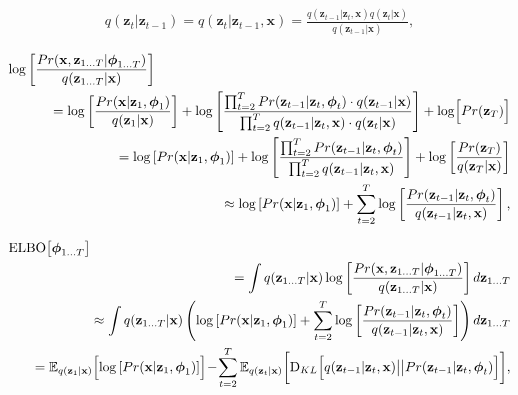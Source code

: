 \documentclass[letterpaper,twoside,openany, titlepage,oldfontcommands,titles,dvipsnames]{memoir}
\begin{document}
\begin{eqnarray}
 q(\mathbf{z}_{t}|\mathbf{z}_{t-1}) = q(\mathbf{z}_{t}|\mathbf{z}_{t-1},\mathbf{x}) = \frac{q(\mathbf{z}_{t-1}|\mathbf{z}_{t},\mathbf{x})q(\mathbf{z}_{t}|\mathbf{x})}{q(\mathbf{z}_{t-1}|\mathbf{x})},
 \end{eqnarray}

\begin{eqnarray}\label{eq:diffusion_simplify_2}
 \log\left[
 \frac{Pr(\mathbf{x},\mathbf{z}_{1\ldots T}|\boldsymbol\phi_{1\ldots T}) }{q(\mathbf{z}_{1\ldots T}|\mathbf{x})}\right] &&\nonumber \\
 &&\hspace{-3cm}= \log\left[\frac{ Pr(\mathbf{x}|\mathbf{z}_{1},\boldsymbol\phi_1)}{q(\mathbf{z}_{1}|\mathbf{x})}\right]+\log\left[\frac{\prod_{t=2}^{T}Pr(\mathbf{z}_{t-1}|\mathbf{z}_{t},\boldsymbol\phi_t)\cdot q(\mathbf{z}_{t-1}|\mathbf{x})}{\prod_{t=2}^{T}q(\mathbf{z}_{t-1}|\mathbf{z}_{t},\mathbf{x})\cdot q(\mathbf{z}_{t}|\mathbf{x})}\right]+\log\Bigl[Pr(\mathbf{z}_{T})\Bigr]\nonumber \\
 &&\hspace{-3cm}=\log\left[Pr(\mathbf{x}|\mathbf{z}_{1},\boldsymbol\phi_1)\right]+\log\left[\frac{\prod_{t=2}^{T}Pr(\mathbf{z}_{t-1}|\mathbf{z}_{t},\boldsymbol\phi_t)}{\prod_{t=2}^{T}q(\mathbf{z}_{t-1}|\mathbf{z}_{t},\mathbf{x})}\right]+\log\left[\frac{Pr(\mathbf{z}_{T})}{q(\mathbf{z}_{T}|\mathbf{x})} \right]\nonumber\\
 &&\hspace{-3cm}\approx\log\left[Pr(\mathbf{x}|\mathbf{z}_{1},\boldsymbol\phi_1)\right]+\sum_{t=2}^{T}\log\left[\frac{Pr(\mathbf{z}_{t-1}|\mathbf{z}_{t},\boldsymbol\phi_t)}{q(\mathbf{z}_{t-1}|\mathbf{z}_{t},\mathbf{x})}\right],
 \end{eqnarray}

\begin{eqnarray}\label{eq:diffusion_loss_2}
 \mbox{ELBO}\bigl[\boldsymbol\phi_{1\ldots T}\bigr]&&\\
 &&\hspace{-1.8cm} =\int q(\mathbf{z}_{1\ldots T}|\mathbf{x})\log\left[
 \frac{Pr(\mathbf{x},\mathbf{z}_{1\ldots T}|\boldsymbol\phi_{1\ldots T}) }{q(\mathbf{z}_{1\ldots T}|\mathbf{x})}\right]d\mathbf{z}_{1\ldots T}\nonumber\\
 &&\hspace{-1.8cm} \approx\int q(\mathbf{z}_{1\ldots T}|\mathbf{x})
 \left(\log\left[Pr(\mathbf{x}|\mathbf{z}_{1},\boldsymbol\phi_1)\right]+\sum_{t=2}^{T}\log\left[\frac{Pr(\mathbf{z}_{t-1}|\mathbf{z}_{t},\boldsymbol\phi_t)}{q(\mathbf{z}_{t-1}|\mathbf{z}_{t},\mathbf{x})}\right]\right)d\mathbf{z}_{1\ldots T}\nonumber\\
 &&\hspace{-1.8cm} =\mathbb{E}_{q(\mathbf{z}_{1}|\mathbf{x})}\Bigl[\log\left[Pr(\mathbf{x}|\mathbf{z}_{1},\boldsymbol\phi_1)\right]\Bigr]\! -\! \sum_{t=2}^T \mathbb{E}_{q(\mathbf{z}_{t}|\mathbf{x})}\biggl[\mbox{D}_{KL}\Bigl[q(\mathbf{z}_{t-1}|\mathbf{z}_{t},\mathbf{x})\bigl|\bigr|Pr(\mathbf{z}_{t-1}|\mathbf{z}_{t},\boldsymbol\phi_t)\Bigr]\biggr],\nonumber
 \end{eqnarray}
\end{document}
